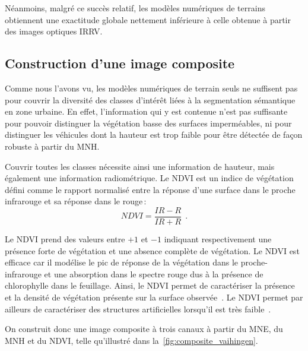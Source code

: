 Néanmoins, malgré ce succès relatif, les modèles numériques de terrains obtiennent une exactitude globale nettement inférieure à celle obtenue à partir des images optiques \gls{IRRV}.

\subsection{Construction d'une image composite}
\label{sec:composite}

Comme nous l'avons vu, les modèles numériques de terrain seuls ne suffisent pas pour couvrir la diversité des classes d'intérêt liées à la segmentation sémantique en zone urbaine. En effet, l'information qui y est contenue n'est pas suffisante pour pouvoir distinguer la végétation basse des surfaces imperméables, ni pour distinguer les véhicules dont la hauteur est trop faible pour être détectée de façon robuste à partir du \gls{MNH}.

Couvrir toutes les classes nécessite ainsi une information de hauteur, mais également une information radiométrique. Le \gls{NDVI} est un indice de végétation défini comme le rapport normalisé entre la réponse d'une surface dans le proche infrarouge et sa réponse dans le rouge\,:
\begin{equation}
\mathit{NDVI} = \frac{\mathit{IR} - R}{\mathit{IR} + R}~~.
\end{equation}

Le \gls{NDVI} prend des valeurs entre $+1$ et $-1$ indiquant respectivement une présence forte de végétation et une absence complète de végétation. Le \gls{NDVI} est efficace car il modélise le pic de réponse de la végétation dans le proche-infrarouge et une absorption dans le spectre rouge dus à la présence de chlorophylle dans le feuillage. Ainsi, le \gls{NDVI} permet de caractériser la présence et la densité de végétation présente sur la surface observée~\cite{myneni_interpretation_1995}. Le \gls{NDVI} permet par ailleurs de caractériser des structures artificielles lorsqu'il est très faible~\cite{sakamoto_automatic_2004}.

On construit donc une image composite à trois canaux à partir du \gls{MNE}, du \gls{MNH} et du \gls{NDVI}, telle qu'illustré dans la~\cref{fig:composite_vaihingen}.


